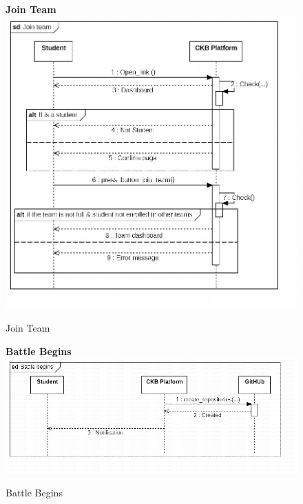 \begin{enumerate}[label=\textbf{[UC\arabic*]}]
    \begin{figure}
    \item \textbf{Join Team}
        \centering
        \includegraphics[width= \textwidth]{Images/Join team.jpg}
        \caption{Join Team}
        \label{fig:enter-label}
    \end{figure}
    
    \begin{figure}
    \item \textbf{Battle Begins}
        \centering
        \includegraphics[width= \textwidth]{Images/Battle begins.jpg}
        \caption{Battle Begins}
        \label{fig:enter-label}
    \end{figure}
    

\end{enumerate}
